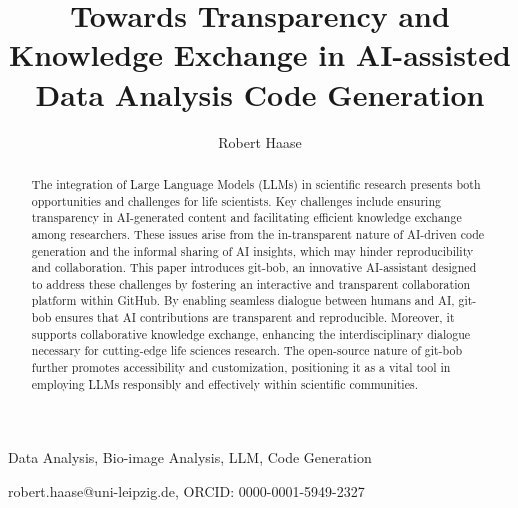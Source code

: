 \documentclass[times, twoside]{zHenriquesLab-StyleBioRxiv}
\begin{document}
\title{Towards Transparency and Knowledge Exchange in AI-assisted Data Analysis Code Generation}

\author[1,2,\Letter]{Robert Haase}


\maketitle

\begin{abstract}

The integration of Large Language Models (LLMs) in scientific research presents both opportunities and challenges for life scientists. Key challenges include ensuring transparency in AI-generated content and facilitating efficient knowledge exchange among researchers. These issues arise from the in-transparent nature of AI-driven code generation and the informal sharing of AI insights, which may hinder reproducibility and collaboration. This paper introduces git-bob, an innovative AI-assistant designed to address these challenges by fostering an interactive and transparent collaboration platform within GitHub. By enabling seamless dialogue between humans and AI, git-bob ensures that AI contributions are transparent and reproducible. Moreover, it supports collaborative knowledge exchange, enhancing the interdisciplinary dialogue necessary for cutting-edge life sciences research. The open-source nature of git-bob further promotes accessibility and customization, positioning it as a vital tool in employing LLMs responsibly and effectively within scientific communities.

\end {abstract}

\begin{keywords}
Data Analysis, Bio-image Analysis, LLM, Code Generation
\end{keywords}

\begin{corrauthor}
robert.haase@uni-leipzig.de, ORCID: 0000-0001-5949-2327
\end{corrauthor}
\end{document}
